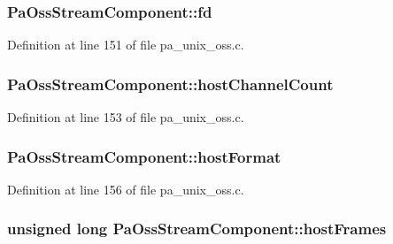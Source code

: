 \subsubsection[{\texorpdfstring{fd}{fd}}]{ Pa\+Oss\+Stream\+Component\+::fd}\hypertarget{struct_pa_oss_stream_component_a8d09b328d855276bb629abc1d072f9ae}{}\label{struct_pa_oss_stream_component_a8d09b328d855276bb629abc1d072f9ae}


Definition at line 151 of file pa\+\_\+unix\+\_\+oss.\+c.

\subsubsection[{\texorpdfstring{host\+Channel\+Count}{hostChannelCount}}]{ Pa\+Oss\+Stream\+Component\+::host\+Channel\+Count}\hypertarget{struct_pa_oss_stream_component_afb06f5b856942cabc3732432503d3cb1}{}\label{struct_pa_oss_stream_component_afb06f5b856942cabc3732432503d3cb1}


Definition at line 153 of file pa\+\_\+unix\+\_\+oss.\+c.

\subsubsection[{\texorpdfstring{host\+Format}{hostFormat}}]{ Pa\+Oss\+Stream\+Component\+::host\+Format}\hypertarget{struct_pa_oss_stream_component_aa41af4e1aeb5a24218a5fb6b629ade02}{}\label{struct_pa_oss_stream_component_aa41af4e1aeb5a24218a5fb6b629ade02}


Definition at line 156 of file pa\+\_\+unix\+\_\+oss.\+c.

\subsubsection[{\texorpdfstring{host\+Frames}{hostFrames}}]{\setlength{\rightskip}{0pt plus 5cm}unsigned long Pa\+Oss\+Stream\+Component\+::host\+Frames}\hypertarget{struct_pa_oss_stream_component_af1038464cf9b2905e8024479ae79958e}{}\label{struct_pa_oss_stream_component_af1038464cf9b2905e8024479ae79958e}


